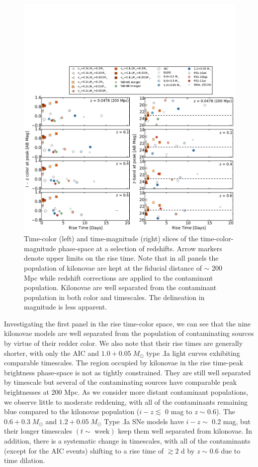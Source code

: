 \begin{figure}[t!]
\centering
\includegraphics[trim= 0 0 0 250 ,clip,width=\textwidth]{./figs/chapter2/ch2_f3.pdf}
\caption{Time-color (left) and time-magnitude (right) slices of the time-color-magnitude phase-space at a selection of redshifts. Arrow markers denote upper limits on the rise time. Note that in all panels the population of kilonovae are kept at the fiducial distance of $\sim$ 200 Mpc while redshift corrections are applied to the contaminant population. Kilonovae are well separated from the contaminant population in both color and timescales. The delineation in magnitude is less apparent.}
\label{fig:phase}
\end{figure}
   
Investigating the first panel in the rise time-color space, we can see that the nine kilonovae models are well separated from the population of contaminating sources by virtue of their redder color. We also note that their rise times are generally shorter, with only the AIC and $1.0+0.05\;M_{\odot}$ type .Ia light curves exhibiting comparable timescales. The region occupied by kilonovae in the rise time-peak brightness phase-space is not as tightly constrained. They are still well separated by timescale but several of the contaminating sources have comparable peak brightnesses at 200 Mpc. As we consider more distant contaminant populations, we observe little to moderate reddening, with all of the contaminants remaining blue compared to the kilonovae population ($i-z\lesssim$ 0 mag to {\em z} $\sim$ 0.6). The $0.6+0.3\;M_{\odot}$ and $1.2+0.05\;M_{\odot}$ Type .Ia SNe models have $i-z\sim$ 0.2 mag, but their longer timescales $(t\sim\text{ week})$ keep them well separated from kilonovae. In addition, there is a systematic change in timescales, with all of the contaminants (except for the AIC events) shifting to a rise time of $\gtrsim  2$ d by {\em z} $\sim$ 0.6 due to time dilation. 
   
